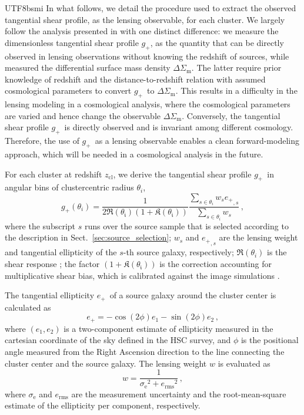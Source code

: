 \documentclass[longauth]{aa}
\newcommand{\zcl}{\ensuremath{z_{\mathrm{cl}}}}
\newcommand{\gshear}{\ensuremath{g_{+}}}
\newcommand{\eplus}{\ensuremath{e_{+}}}
\newcommand{\lensingw}{\ensuremath{w}}
\newcommand{\deltaSigma}{\ensuremath{\Delta{\Sigma}_{\mathrm{m}}}}
\begin{document}
\begin{CJK*}{UTF8}{bsmi}
In what follows, we detail the procedure used to extract the observed tangential shear profile, as the lensing observable, for each cluster.
We largely follow the analysis presented in \cite{umetsu20} with one distinct difference: 
we measure the dimensionless tangential shear profile \gshear, as the quantity that can be directly observed in lensing observations without knowing the redshift of sources, while \cite{umetsu20} measured the differential surface mass density \deltaSigma.
The latter require prior knowledge of redshift and the distance-to-redshift relation with assumed cosmological parameters to 
convert \gshear\ to \deltaSigma.
This results in a difficulty in the lensing modeling in a cosmological analysis, where the cosmological parameters are varied and hence change the observable \deltaSigma.
Conversely, the tangential shear profile \gshear\ is directly observed and is invariant among different cosmology.
Therefore, the use of \gshear\ as a lensing observable enables a clean forward-modeling approach, which will be needed in a cosmological analysis in the future.


For each cluster at redshift \zcl, we derive the tangential shear profile \gshear\ in angular bins of clustercentric radius $\theta_{i}$,
%
\begin{equation}
\label{eq:gshear}
\gshear\left(\theta_{i}\right) = 
\frac{1
}{
2\mathfrak{R(\theta_{i})}\left(1 + \mathfrak{K(\theta_{i})}\right)
}
\frac{
\sum\limits_{s\in \theta_{i}} {\lensingw}_{s}  {\eplus}_{,s}  
}{
\sum\limits_{s\in \theta_{i}} {\lensingw}_{s}
}
\, ,
\end{equation}
%
where the subscript $s$ runs over the source sample that is selected according to the description in Sect.~\ref{sec:source_selection}; ${\lensingw}_{s}$ and ${\eplus}_{,s}$ are the lensing weight and tangential ellipticity of the $s$-th source galaxy, respectively; $\mathfrak{R}(\theta_{i})$ is the shear response \citep[see also][]{mandalbaum05b}; the factor $\left(1 + \mathfrak{K(\theta_{i})}\right)$ is the correction accounting for multiplicative shear bias, which is calibrated against the image simulations \citep{mandelbaum18,mandalbaum18b}.

The tangential ellipticity \eplus\ of a source galaxy around the cluster center is calculated as
%
\begin{equation}
\label{eq:eplus}
\eplus = -\cos(2\phi) e_{1} - \sin(2\phi) e_{2}
\, ,
\end{equation}
%
where $\left( e_{1}, e_{2} \right)$ is a two-component estimate of ellipticity measured in the cartesian coordinate of the sky defined in the HSC survey, and $\phi$ is the positional angle measured from the Right Ascension direction to the line connecting the cluster center and the source galaxy.
The lensing weight $\lensingw$ is evaluated as
%
\begin{equation}
\label{eq:lensing_weight}
\lensingw = \frac{1}{
{ \sigma_{\mathrm{e}} }^2 + { e_{\mathrm{rms}} }^2
}
\, ,
\end{equation}
%
where $\sigma_{\mathrm{e}}$ and $e_{\mathrm{rms}}$ are the measurement uncertainty and the root-mean-square estimate of the ellipticity per component, respectively.


\end{CJK*}
\end{document}
